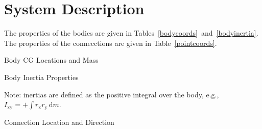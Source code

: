 \section{System Description}
The properties of the bodies are given in Tables~\ref{bodycoords}~and~\ref{bodyinertia}.
The properties of the connecctions are given in Table~\ref{pointcoords}.
\begin{table}[ht]
\begin{center}
\begin{threeparttable}
\begin{footnotesize}
\caption{Body CG Locations and Mass}
\label{bodycoords}
\end{footnotesize}
\end{threeparttable}
\end{center}
\end{table}
\begin{table}[ht]
\begin{center}
\begin{threeparttable}
\begin{footnotesize}
\caption{Body Inertia Properties}
\label{bodyinertia}
\begin{tablenotes}
\item Note: inertias are defined as the positive integral over the body, e.g., $I_{\textrm{xy}}=+\! \int \! r_{\textrm{x}}r_{\textrm{y}} \,\text{d}m $.
\end{tablenotes}
\end{footnotesize}
\end{threeparttable}
\end{center}
\end{table}
\begin{table}[ht]
\begin{center}
\begin{threeparttable}
\begin{footnotesize}
\caption{Connection Location and Direction}
\label{pointcoords}
\end{footnotesize}
\end{threeparttable}
\end{center}
\end{table}

